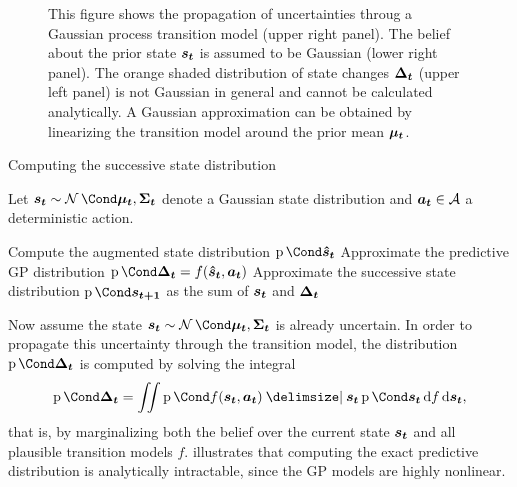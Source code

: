 \begin{figure}[p]
    \centering
    \caption[Uncertainty propagation using linearization]{
        This figure shows the propagation of uncertainties throug a Gaussian process transition model (upper right panel).
        The belief about the prior state $\bm{s_t}$ is assumed to be Gaussian (lower right panel).
        The orange shaded distribution of state changes $\bm{\Delta_t}$ (upper left panel) is not Gaussian in general and cannot be calculated analytically.
        A Gaussian approximation can be obtained by linearizing the transition model around the prior mean $\bm{\mu_t}$.
    }
    \label{fig:linearization}
\end{figure}
\begin{algorithm}[p]
    \caption{Computing the successive state distribution}
    \label{alg:linearization}
    Let $\rv{s_t} \sim \Gaussian{\mat{\mu_t}, \mat{\Sigma_t}}$ denote a Gaussian state distribution and $\bm{a_t} \in \mathcal{A}$ a deterministic action.
    \begin{algorithmic}[1]
        \State Compute the augmented state distribution $\Prob{\rv{\hat{s}_t}}$
        \State Approximate the predictive GP distribution $\Prob{\rv{\Delta_t}} = f(\rv{\hat{s}_t}, \mat{a_t})$
        \State Approximate the successive state distribution $\Prob{\rv{s_{t+1}}}$ as the sum of $\bm{s_t}$ and $\bm{\Delta_t}$
    \end{algorithmic}
\end{algorithm}
Now assume the state $\rv{s_t} \sim \Gaussian{\mat{\mu_t}, \mat{\Sigma_t}}$ is already uncertain.
In order to propagate this uncertainty through the transition model, the distribution $\Prob{\rv{\Delta_t}}$ is computed by solving the integral
\begin{align}
    \Prob{\rv{\Delta_t}} = \iint \Prob{f(\rv{s_t}, \mat{a_t}) \given \rv{s_t}} \Prob{\rv{s_t}} \diff f \diff \rv{s_t},
\end{align}
that is, by marginalizing both the belief over the current state $\bm{s_t}$ and all plausible transition models $f$.
 illustrates that computing the exact predictive distribution is analytically intractable, since the GP models are highly nonlinear.


